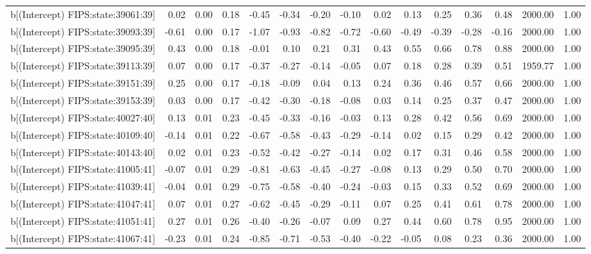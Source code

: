 \begin{table}[ht]
\begin{tabular}{rrrrrrrrrrrrrrr}
  b[(Intercept) FIPS:state:39061:39] & 0.02 & 0.00 & 0.18 & -0.45 & -0.34 & -0.20 & -0.10 & 0.02 & 0.13 & 0.25 & 0.36 & 0.48 & 2000.00 & 1.00 \\ 
  b[(Intercept) FIPS:state:39093:39] & -0.61 & 0.00 & 0.17 & -1.07 & -0.93 & -0.82 & -0.72 & -0.60 & -0.49 & -0.39 & -0.28 & -0.16 & 2000.00 & 1.00 \\ 
  b[(Intercept) FIPS:state:39095:39] & 0.43 & 0.00 & 0.18 & -0.01 & 0.10 & 0.21 & 0.31 & 0.43 & 0.55 & 0.66 & 0.78 & 0.88 & 2000.00 & 1.00 \\ 
  b[(Intercept) FIPS:state:39113:39] & 0.07 & 0.00 & 0.17 & -0.37 & -0.27 & -0.14 & -0.05 & 0.07 & 0.18 & 0.28 & 0.39 & 0.51 & 1959.77 & 1.00 \\ 
  b[(Intercept) FIPS:state:39151:39] & 0.25 & 0.00 & 0.17 & -0.18 & -0.09 & 0.04 & 0.13 & 0.24 & 0.36 & 0.46 & 0.57 & 0.66 & 2000.00 & 1.00 \\ 
  b[(Intercept) FIPS:state:39153:39] & 0.03 & 0.00 & 0.17 & -0.42 & -0.30 & -0.18 & -0.08 & 0.03 & 0.14 & 0.25 & 0.37 & 0.47 & 2000.00 & 1.00 \\ 
  b[(Intercept) FIPS:state:40027:40] & 0.13 & 0.01 & 0.23 & -0.45 & -0.33 & -0.16 & -0.03 & 0.13 & 0.28 & 0.42 & 0.56 & 0.69 & 2000.00 & 1.00 \\ 
  b[(Intercept) FIPS:state:40109:40] & -0.14 & 0.01 & 0.22 & -0.67 & -0.58 & -0.43 & -0.29 & -0.14 & 0.02 & 0.15 & 0.29 & 0.42 & 2000.00 & 1.00 \\ 
  b[(Intercept) FIPS:state:40143:40] & 0.02 & 0.01 & 0.23 & -0.52 & -0.42 & -0.27 & -0.14 & 0.02 & 0.17 & 0.31 & 0.46 & 0.58 & 2000.00 & 1.00 \\ 
  b[(Intercept) FIPS:state:41005:41] & -0.07 & 0.01 & 0.29 & -0.81 & -0.63 & -0.45 & -0.27 & -0.08 & 0.13 & 0.29 & 0.50 & 0.70 & 2000.00 & 1.00 \\ 
  b[(Intercept) FIPS:state:41039:41] & -0.04 & 0.01 & 0.29 & -0.75 & -0.58 & -0.40 & -0.24 & -0.03 & 0.15 & 0.33 & 0.52 & 0.69 & 2000.00 & 1.00 \\ 
  b[(Intercept) FIPS:state:41047:41] & 0.07 & 0.01 & 0.27 & -0.62 & -0.45 & -0.29 & -0.11 & 0.07 & 0.25 & 0.41 & 0.61 & 0.78 & 2000.00 & 1.00 \\ 
  b[(Intercept) FIPS:state:41051:41] & 0.27 & 0.01 & 0.26 & -0.40 & -0.26 & -0.07 & 0.09 & 0.27 & 0.44 & 0.60 & 0.78 & 0.95 & 2000.00 & 1.00 \\ 
  b[(Intercept) FIPS:state:41067:41] & -0.23 & 0.01 & 0.24 & -0.85 & -0.71 & -0.53 & -0.40 & -0.22 & -0.05 & 0.08 & 0.23 & 0.36 & 2000.00 & 1.00 \\ 

\end{tabular}
\end{table}
